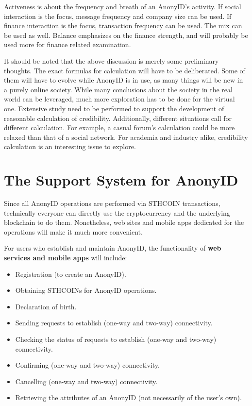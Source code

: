 \documentclass[12pt, a4paper]{article}
\begin{document}
Activeness is about the frequency and breath of an AnonyID's activity. If social interaction is the focus, message frequency and company size can be used. If finance interaction is the focus, transaction frequency can be used. The mix can be used as well. Balance emphasizes on the finance strength, and will probably be used more for finance related examination. 

It should be noted that the above discussion is merely some preliminary thoughts. The exact formulas for calculation will have to be deliberated. Some of them will have to evolve while AnonyID is in use, as many things will be new in a purely online society. While many conclusions about the society in the real world can be leveraged, much more exploration has to be done for the virtual one. Extensive study need to be performed to support the development of reasonable calculation of credibility. Additionally, different situations call for different calculation. For example, a casual forum's calculation could be more relaxed than that of a social network. For academia and industry alike, credibility calculation is an interesting issue to explore.

\section{The Support System for AnonyID}

Since all AnonyID operations are performed via STHCOIN transactions, technically everyone can directly use the cryptocurrency and the underlying blockchain to do them. Nonetheless, web sites and mobile apps dedicated for the operations will make it much more convenient. 

For users who establish and maintain AnonyID, the functionality of \textbf{web services and mobile apps} will include: 

\begin{itemize}
\item Registration (to create an AnonyID).
\item Obtaining STHCOINs for AnonyID operations.
\item Declaration of birth.
\item Sending requests to establish (one-way and two-way) connectivity.
\item Checking the status of requests to establish (one-way and two-way) connectivity.
\item Confirming (one-way and two-way) connectivity.
\item Cancelling (one-way and two-way) connectivity.
\item Retrieving the attributes of an AnonyID (not necessarily of the user's own).
\end{itemize}
\end{document}
